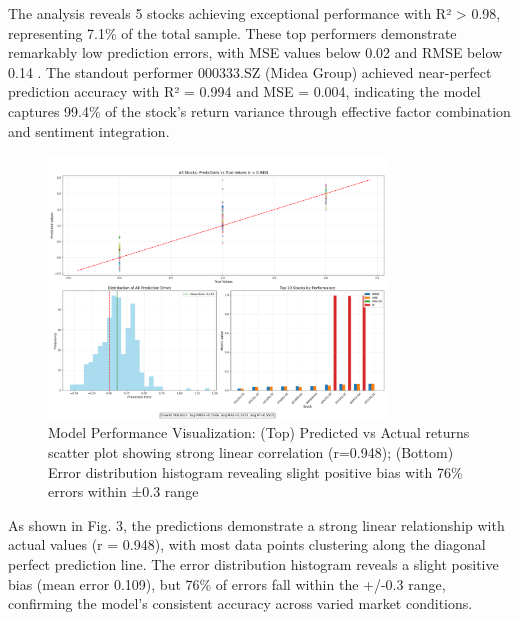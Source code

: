\documentclass[3p,times,procedia]{elsarticle}
\begin{document}
The analysis reveals 5 stocks achieving exceptional performance with R² > 0.98, representing 7.1\% of the total sample. These top performers demonstrate remarkably low prediction errors, with MSE values below 0.02 and RMSE below 0.14 \cite{Bao2017}. The standout performer 000333.SZ (Midea Group) achieved near-perfect prediction accuracy with R² = 0.994 and MSE = 0.004, indicating the model captures 99.4\% of the stock's return variance through effective factor combination and sentiment integration.
\begin{figure}[!ht] %
    \centering
    \includegraphics[width=0.80\textwidth]{Picture3.png} %

    \caption{Model Performance Visualization: (Top) Predicted vs Actual returns scatter plot showing strong linear correlation (r=0.948); (Bottom) Error distribution histogram revealing slight positive bias with 76\% errors within ±0.3 range}
    \label{fig:Return Forecast Calculation}
\end{figure}

As shown in Fig. 3, the predictions demonstrate a strong linear relationship with actual values (r = 0.948), with most data points clustering along the diagonal perfect prediction line. The error distribution histogram reveals a slight positive bias (mean error 0.109), but 76\% of errors fall within the +/-0.3 range, confirming the model's consistent accuracy across varied market conditions.

\end{document}
